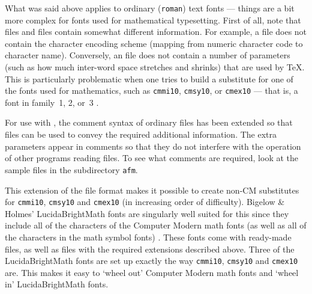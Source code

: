 \vskip 0.1in


\vskip 0.1in

\noindent
What was said above applies to ordinary ({\tt roman}) text fonts --- things
are a bit more complex for fonts used for mathematical typesetting.
First of all, note that {\AFM} files and {\TFM} files contain somewhat
different information.
For example, a {\TFM} file does not contain 
the character encoding scheme 
(mapping from numeric character code to character name).
Conversely, an {\AFM} file does not contain a number of parameters 
(such as how much inter-word space stretches and shrinks) 
that are used by {\TeX}.
This is particularly problematic when one tries to build a substitute
for one of the fonts used for mathematics,
such as {\tt cmmi10}, {\tt cmsy10}, or {\tt cmex10} --- that is, a font
in family~1, 2, or~3%
.

For use with {\AFMTOTFM}, the comment syntax of ordinary {\AFM} files has
been extended %
so that {\AFM} files can be used to convey the
required additional information. %
The extra parameters appear in {\AFM} comments so that they do not
interfere with the operation of %
other programs reading {\AFM} files.
To see what comments are required, 
look at the sample %
files in the subdirectory {\tt afm}.

This extension of the {\AFM} file format makes it possible to create
non-CM substitutes for {\tt cmmi10}, {\tt cmsy10} and {\tt cmex10} 
(in increasing order of difficulty).
Bigelow \& Holmes' LucidaBrightMath fonts are singularly well suited
for this since they include all of the characters of the Computer
Modern math fonts  
(as well as all of the characters in the {\AMS} math symbol fonts)%
. 
These fonts come with ready-made {\TFM} files, as well as {\AFM} files
with the required extensions described above.
Three of the LucidaBrightMath fonts are set up exactly the way
{\tt cmmi10}, {\tt cmsy10} and {\tt cmex10} are.
This makes it easy to `wheel out' Computer Modern math fonts 
and `wheel in' LucidaBrightMath fonts.

